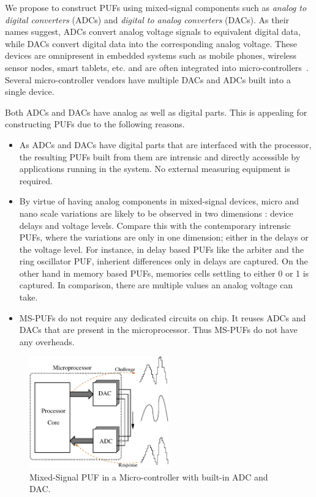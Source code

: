 We propose to construct PUFs using mixed-signal components such as {\em analog to
digital converters} (ADCs) and {\em digital to analog converters} (DACs).
As their names suggest, ADCs convert analog voltage signals 
to equivalent digital data, while DACs convert digital data into the corresponding
analog voltage. These devices are omnipresent in embedded 
systems such as mobile phones, wireless sensor nodes, smart tablets, etc.
and are often integrated into micro-controllers~\cite{xxx}. Several 
micro-controller vendors have multiple DACs and ADCs built into a
single device.

Both ADCs and DACs have analog as well as digital parts. This is
appealing for constructing PUFs due to the following reasons.
\begin{itemize}
\item As ADCs and DACs have digital parts that are interfaced with the
processor, the resulting PUFs built from them are intrensic and  
directly accessible by applications running in the system. No external 
measuring equipment is required.

\item By virtue of having analog components in mixed-signal devices, 
micro and nano scale variations are likely to be observed in two dimensions : 
device delays and voltage levels. Compare this with the contemporary intrensic
PUFs, where the variations are only in one dimension; either in the delays or
the voltage level. For instance, in delay based PUFs like the arbiter and the 
ring oscillator PUF, inherient differences
only in delays are captured. On the other hand in memory based PUFs, memories 
cells settling to either 0 or 1 is captured. In comparison, there are multiple 
values an analog voltage can take.

\item MS-PUFs do not require any dedicated circuits on chip. It reuses ADCs and
DACs that are present in the microprocessor. Thus MS-PUFs do not have any overheads.
\end{itemize}

\begin{figure}[!b]
\centering
\caption{Mixed-Signal PUF in a Micro-controller with built-in ADC and DAC.\label{fig:mspuf} }
\includegraphics[width=6cm]{figs/mspuf}
\end{figure}


